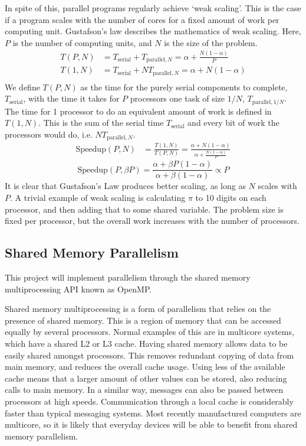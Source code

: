 \documentclass[../main.tex]{subfiles}
\begin{document}
    In spite of this, parallel programs regularly achieve `weak scaling'.
    This is the case if a program scales with the number of cores for a fixed amount of work per computing unit.
    Gustafson's law describes the mathematics of weak scaling.
    Here, $P$ is the number of computing units, and $N$ is the size of the problem.
    \begin{align*}
      T(P,N) &= T_\text{serial} + T_{\text{parallel},N} = \alpha + \frac{N(1-\alpha)}{P} \\
      T(1,N) &= T_\text{serial} + NT_{\text{parallel},N} = \alpha + N(1-\alpha) \\
    \end{align*}
    We define $T(P,N)$ as the time for the purely serial components to complete, $T_\text{serial}$, with the time it takes for $P$ processors one task of size $1/N$, $T_{\text{parallel},1/N}$.
    The time for 1 processor to do an equivalent amount of work is defined in $T(1,N)$.
    This is the sum of the serial time $T_\text{serial}$ and every bit of work the processors would do, i.e. $NT_{\text{parallel},N}$.
    \begin{align*}
      \text{Speedup}(P,N) &= \frac{T(1,N)}{T(P,N)} = \frac{\alpha+N(1-\alpha)}{\alpha+\frac{N(1-\alpha)}{P}} 
    \end{align*}
    \begin{equation}
      \text{Speedup}(P,\beta P) = \frac{\alpha+\beta P(1-\alpha)}{\alpha+\beta(1-\alpha)} \propto P
      \label{gustafson}
    \end{equation}
    It is clear that Gustafson's Law produces better scaling, as long as $N$ scales with $P$.
    A trivial example of weak scaling is calculating $\pi$ to 10 digits on each processor, and then adding that to some shared variable.
    The problem size is fixed per processor, but the overall work increases with the number of processors.
  \subsection{Shared Memory Parallelism}
    This project will implement parallelism through the shared memory multiprocessing API known as OpenMP.

    Shared memory multiprocessing is a form of parallelism that relies on the presence of shared memory.
    This is a region of memory that can be accessed equally by several processors.
    Normal examples of this are in multicore systems, which have a shared L2 or L3 cache.
    Having shared memory allows data to be easily shared amongst processors.
    This removes redundant copying of data from main memory, and reduces the overall cache usage.
    Using less of the available cache means that a larger amount of other values can be stored, also reducing calls to main memory.
    In a similar way, messages can also be passed between processors at high speeds.
    Communication through a local cache is considerably faster than typical messaging systems.
    Most recently manufactured computers are multicore, so it is likely that everyday devices will be able to benefit from shared memory parallelism.
\end{document}
